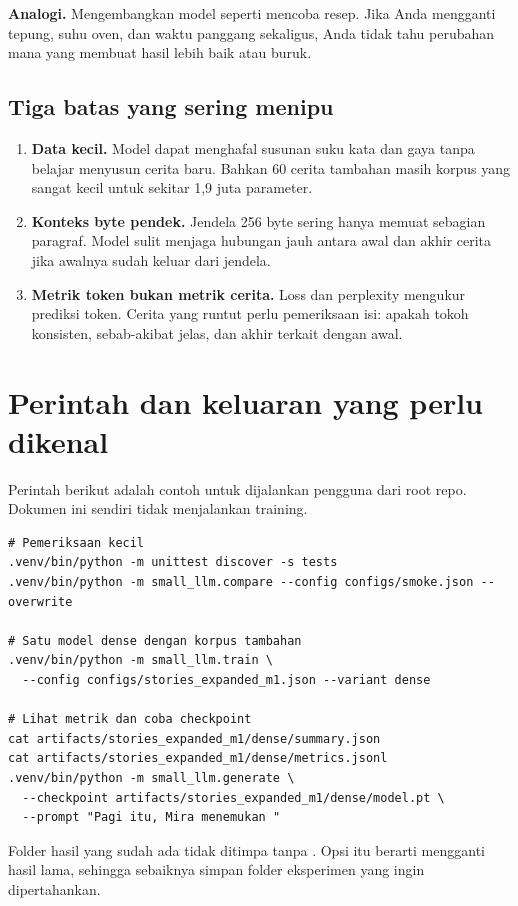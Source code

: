 \documentclass[11pt,a4paper]{article}
\DeclareRobustCommand{\code}[1]{\texttt{\detokenize{#1}}}
\newcommand{\analogi}[1]{\par\smallskip\noindent\textbf{Analogi.} #1\par\smallskip}
\begin{document}
\analogi{Mengembangkan model seperti mencoba resep. Jika Anda mengganti
tepung, suhu oven, dan waktu panggang sekaligus, Anda tidak tahu
perubahan mana yang membuat hasil lebih baik atau buruk.}

\subsection{Tiga batas yang sering menipu}
\begin{enumerate}
\item \textbf{Data kecil.} Model dapat menghafal susunan suku kata dan
gaya tanpa belajar menyusun cerita baru. Bahkan 60 cerita tambahan
masih korpus yang sangat kecil untuk sekitar 1,9 juta parameter.
\item \textbf{Konteks byte pendek.} Jendela 256 byte sering hanya
memuat sebagian paragraf. Model sulit menjaga hubungan jauh antara
awal dan akhir cerita jika awalnya sudah keluar dari jendela.
\item \textbf{Metrik token bukan metrik cerita.} Loss dan perplexity
mengukur prediksi token. Cerita yang runtut perlu pemeriksaan isi:
apakah tokoh konsisten, sebab-akibat jelas, dan akhir terkait
dengan awal.
\end{enumerate}

\section{Perintah dan keluaran yang perlu dikenal}

Perintah berikut adalah contoh untuk dijalankan pengguna dari root repo.
Dokumen ini sendiri tidak menjalankan training.
\begin{lstlisting}[language={}]
# Pemeriksaan kecil
.venv/bin/python -m unittest discover -s tests
.venv/bin/python -m small_llm.compare --config configs/smoke.json --overwrite

# Satu model dense dengan korpus tambahan
.venv/bin/python -m small_llm.train \
  --config configs/stories_expanded_m1.json --variant dense

# Lihat metrik dan coba checkpoint
cat artifacts/stories_expanded_m1/dense/summary.json
cat artifacts/stories_expanded_m1/dense/metrics.jsonl
.venv/bin/python -m small_llm.generate \
  --checkpoint artifacts/stories_expanded_m1/dense/model.pt \
  --prompt "Pagi itu, Mira menemukan "
\end{lstlisting}
Folder hasil yang sudah ada tidak ditimpa tanpa \code{--overwrite}.
Opsi itu berarti mengganti hasil lama, sehingga sebaiknya simpan
folder eksperimen yang ingin dipertahankan.
\end{document}
